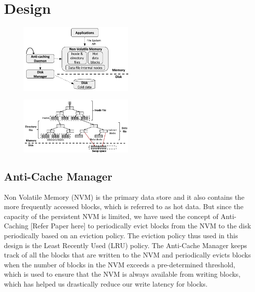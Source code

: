 \section{Design}
\label{sec-design}

\begin{figure}
\centering
\vspace{-0.2in}
\includegraphics[width=0.5\textwidth]{figs/bpfs.pdf}
\vspace{-0.2in}
\end{figure}

\begin{figure}
\centering
\vspace{-0.2in}
\includegraphics[width=0.5\textwidth]{figs/bpfs2.pdf}
\vspace{-0.2in}
\end{figure}


\subsection{Anti-Cache Manager}
Non Volatile Memory (NVM) is the primary data store and it also contains the more frequently accessed blocks, which is referred to as hot data. But since the capacity of the persistent NVM is limited, we have used the concept of Anti-Caching [Refer Paper here] to periodically evict blocks from the NVM to the disk periodically based on an eviction policy. The eviction policy thus used in this design is the Least Recently Used (LRU) policy. The Anti-Cache Manager keeps track of all the blocks that are written to the NVM and periodically evicts blocks when the number of blocks in the NVM exceeds a pre-determined threshold, which is used to ensure that the NVM is always available from writing blocks, which has helped us drastically reduce our write latency for blocks.

